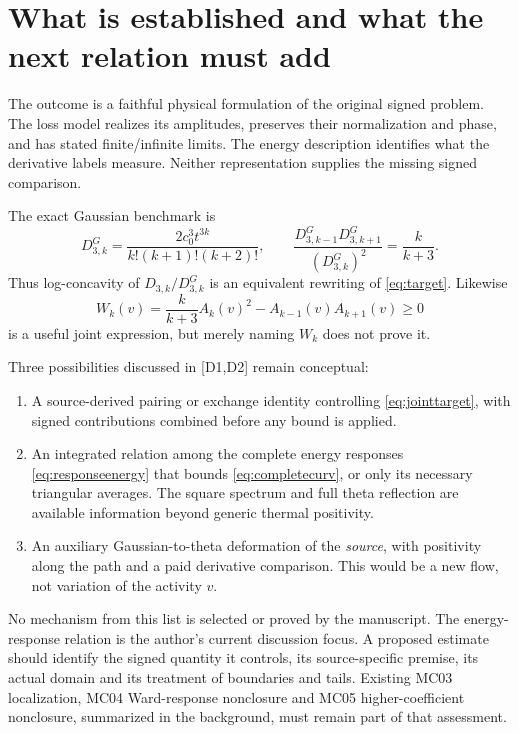 \documentclass[11pt,letterpaper]{article}
\numberwithin{equation}{section}
\theoremstyle{remark}
\newcommand{\ev}[1]{\textsf{[#1]}}
\begin{document}
\section{What is established and what the next relation must add}
\label{sec:next}
The outcome is a faithful physical formulation of the original signed
problem. The loss model realizes its amplitudes, preserves their
normalization and phase, and has stated finite/infinite limits.
The energy description identifies what the derivative labels measure.
Neither representation supplies the missing signed comparison.

The exact Gaussian benchmark is
\begin{equation}
 D^G_{3,k}=\frac{2c_0^3t^{3k}}{k!(k+1)!(k+2)!},\qquad
 \frac{D^G_{3,k-1}D^G_{3,k+1}}{(D^G_{3,k})^2}=\frac{k}{k+3}.
\end{equation}
Thus log-concavity of $D_{3,k}/D^G_{3,k}$ is an equivalent rewriting
of \eqref{eq:target}. Likewise
\begin{equation}
 W_k(v)=\frac{k}{k+3}A_k(v)^2-A_{k-1}(v)A_{k+1}(v)\ge0
 \label{eq:jointtarget}
\end{equation}
is a useful joint expression, but merely naming $W_k$ does not prove it.

Three possibilities discussed in \ev{D1,D2} remain conceptual:
\begin{enumerate}
\item A source-derived pairing or exchange identity controlling
\eqref{eq:jointtarget}, with signed contributions combined before any
bound is applied.
\item An integrated relation among the complete energy responses
\eqref{eq:responseenergy} that bounds \eqref{eq:completecurv}, or only
its necessary triangular averages. The square spectrum and full theta
reflection are available information beyond generic thermal positivity.
\item An auxiliary Gaussian-to-theta deformation of the \emph{source},
with positivity along the path and a paid derivative comparison. This
would be a new flow, not variation of the activity $v$.
\end{enumerate}
No mechanism from this list is selected or proved by the manuscript.
The energy-response relation is the author's current discussion focus.
A proposed estimate should identify the signed quantity it controls,
its source-specific premise, its actual domain and its treatment of
boundaries and tails. Existing MC03 localization, MC04 Ward-response
nonclosure and MC05 higher-coefficient nonclosure, summarized in the
background, must remain part of that assessment.
\end{document}
